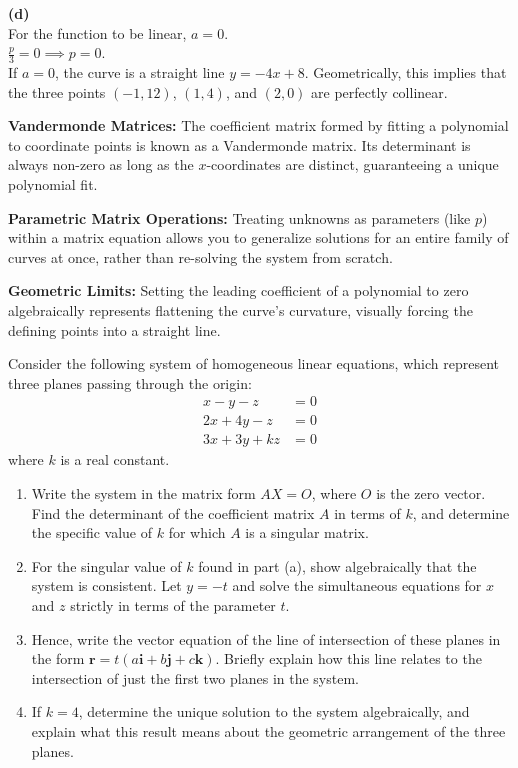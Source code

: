 \begin{solution}
\medskip
\textbf{(d)} \\
For the function to be linear, $a = 0$. \\
$\frac{p}{3} = 0 \implies p = 0$. \\
If $a = 0$, the curve is a straight line $y = -4x + 8$. Geometrically, this implies that the three points $(-1, 12)$, $(1, 4)$, and $(2, 0)$ are perfectly collinear.
\end{solution}

\begin{takeaways}
\item \textbf{Vandermonde Matrices:} The coefficient matrix formed by fitting a polynomial to coordinate points is known as a Vandermonde matrix. Its determinant is always non-zero as long as the $x$-coordinates are distinct, guaranteeing a unique polynomial fit.
\item \textbf{Parametric Matrix Operations:} Treating unknowns as parameters (like $p$) within a matrix equation allows you to generalize solutions for an entire family of curves at once, rather than re-solving the system from scratch.
\item \textbf{Geometric Limits:} Setting the leading coefficient of a polynomial to zero algebraically represents flattening the curve's curvature, visually forcing the defining points into a straight line.
\end{takeaways}


\begin{problem}
Consider the following system of homogeneous linear equations, which represent three planes passing through the origin:
\begin{align*}
x - y - z &= 0 \\
2x + 4y - z &= 0 \\
3x + 3y + kz &= 0
\end{align*}
where $k$ is a real constant.

\begin{enumerate}[label=\textbf{(\alph*)}]
    \item Write the system in the matrix form $AX = O$, where $O$ is the zero vector. Find the determinant of the coefficient matrix $A$ in terms of $k$, and determine the specific value of $k$ for which $A$ is a singular matrix.
    \item For the singular value of $k$ found in part (a), show algebraically that the system is consistent. Let $y = -t$ and solve the simultaneous equations for $x$ and $z$ strictly in terms of the parameter $t$.
    \item Hence, write the vector equation of the line of intersection of these planes in the form $\mathbf{r} = t(a\mathbf{i} + b\mathbf{j} + c\mathbf{k})$. Briefly explain how this line relates to the intersection of just the first two planes in the system.
    \item If $k = 4$, determine the unique solution to the system algebraically, and explain what this result means about the geometric arrangement of the three planes.
\end{enumerate}
\end{problem}

